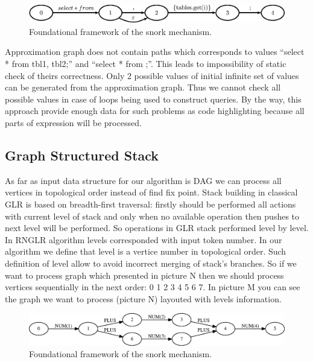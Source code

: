 \documentclass{sigplanconf}
\begin{document}
\begin{figure}
    \begin{center}
        \includegraphics[scale=0.5]{Graphs/cyclesApproximation.eps}
    \end{center}
    \caption{Foundational framework of the snork mechanism.}
    \label{fig-ffsm}
\end{figure}

Approximation graph does not contain paths which corresponds to values “select * from tbl1, tbl2;” and “select * from ;”. This leads to impossibility of static check of theirs correctness. Only 2 possible values of initial infinite set of values can be generated from the approximation graph. Thus we cannot check all possible values in case of loops being used to construct queries. By the way, this approach provide enough data for such problems as code highlighting because all parts of expression will be processed. 

\subsection{Graph Structured Stack}
As far as input data structure for our algorithm is DAG we can process all vertices in topological order instead  of find fix point. Stack building in classical  GLR is based on breadth-first traversal: firstly should be performed all actions with current level of stack and only when no available operation then pushes to next level will be performed. So operations in GLR stack performed level by level. In RNGLR algorithm levels corresponded with input token number. In our algorithm we define that level is a vertice number in topological order. Such definition of level allow to avoid incorrect  merging of stack’s branches. So if we want to process graph which presented in picture N then we should process vertices sequentially in the next order: 0 1 2 3 4 5 6 7. In picture M you can see the graph we want to process (picture N) layouted with levels information.

\begin{figure}
    \begin{center}
        \includegraphics[scale=0.3]{Graphs/toposort0.eps}
    \end{center}
    \caption{Foundational framework of the snork mechanism.}
    \label{fig-ffsm}
\end{figure}
\end{document}
